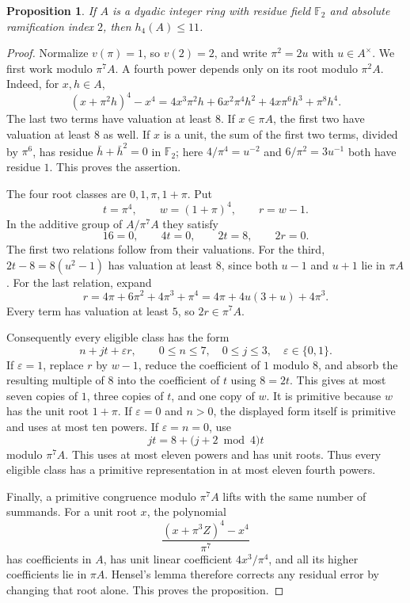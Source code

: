 \documentclass[11pt]{amsart}
\newtheorem{proposition}[theorem]{Proposition}
\theoremstyle{definition}
\numberwithin{equation}{section}
\begin{document}
\begin{proposition}
\label{prop:quartic-ramification-two}
If $A$ is a dyadic integer ring with residue field $\mathbb F_2$ and
absolute ramification index $2$, then $h_4(A)\le11$.
\end{proposition}
\begin{proof}
Normalize $v(\pi)=1$, so $v(2)=2$, and write $\pi^2=2u$ with
$u\in A^\times$. We first work modulo $\pi^7A$.
A fourth power depends only on its root modulo $\pi^2A$.
Indeed, for $x,h\in A$,
\[
 (x+\pi^2h)^4-x^4
 =4x^3\pi^2h+6x^2\pi^4h^2+4x\pi^6h^3+\pi^8h^4.
\]
The last two terms have valuation at least $8$. If $x\in\pi A$,
the first two have valuation at least $8$ as well. If $x$ is a unit,
the sum of the first two terms, divided by $\pi^6$, has residue
$\bar h+\bar h^2=0$ in $\mathbb F_2$; here
$4/\pi^4=u^{-2}$ and $6/\pi^2=3u^{-1}$ both have residue $1$.
This proves the assertion.

The four root classes are $0,1,\pi,1+\pi$. Put
\[
 t=\pi^4,\qquad w=(1+\pi)^4,\qquad r=w-1.
\]
In the additive group of $A/\pi^7A$ they satisfy
\[
 16=0,\qquad 4t=0,\qquad 2t=8,\qquad 2r=0.
\]
The first two relations follow from their valuations. For the third,
$2t-8=8(u^2-1)$ has valuation at least $8$, since both $u-1$ and
$u+1$ lie in $\pi A$. For the last relation, expand
\[
 r=4\pi+6\pi^2+4\pi^3+\pi^4
   =4\pi+4u(3+u)+4\pi^3.
\]
Every term has valuation at least $5$, so $2r\in\pi^7A$.

Consequently every eligible class has the form
\[
 n+jt+\varepsilon r,
 \qquad 0\le n\le7,\quad0\le j\le3,\quad
 \varepsilon\in\{0,1\}.
\]
If $\varepsilon=1$, replace $r$ by $w-1$, reduce the coefficient of
$1$ modulo $8$, and absorb the resulting multiple of $8$ into the
coefficient of $t$ using $8=2t$. This gives at most seven copies of
$1$, three copies of $t$, and one copy of $w$. It is primitive because
$w$ has the unit root $1+\pi$.
If $\varepsilon=0$ and $n>0$, the displayed form itself is primitive
and uses at most ten powers. If $\varepsilon=n=0$, use
\[
 jt=8+\bigl(j+2\bmod4\bigr)t
\]
modulo $\pi^7A$. This uses at most eleven powers and has unit roots.
Thus every eligible class has a primitive representation in at most
eleven fourth powers.

Finally, a primitive congruence modulo $\pi^7A$ lifts with the same
number of summands. For a unit root $x$, the polynomial
\[
 \frac{(x+\pi^3 Z)^4-x^4}{\pi^7}
\]
has coefficients in $A$, has unit linear coefficient
$4x^3/\pi^4$, and all its higher coefficients lie in $\pi A$.
Hensel's lemma therefore corrects any residual error by changing that
root alone. This proves the proposition.
\end{proof}
\end{document}
